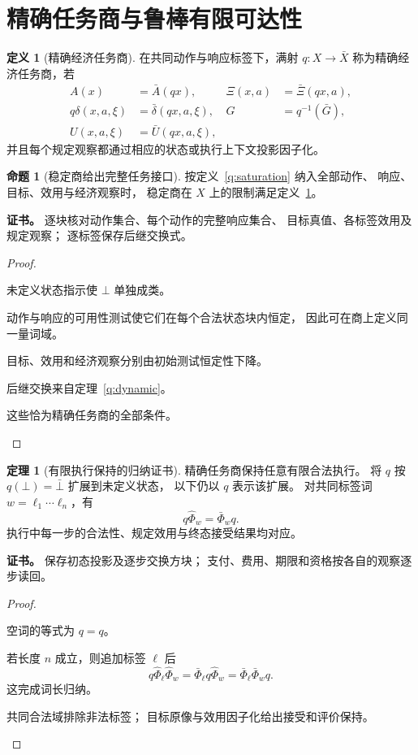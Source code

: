 \documentclass[UTF8,12pt,a4paper,openany,fontset=none,zihao=false]{ctexrep}
\theoremstyle{definition}
\newtheorem{definition}{定义}[chapter]
\newtheorem{theorem}{定理}[chapter]
\newtheorem{proposition}{命题}[chapter]
\newenvironment{certificate}{\par\noindent\textbf{证书。}\ignorespaces}{\par}
\newcommand{\1}{\mathbf 1}
\begin{document}
\section{精确任务商与鲁棒有限可达性}
\begin{definition}[精确经济任务商]
\label{q:exact}
在共同动作与响应标签下，满射 \(q:X\to\bar X\)
称为精确经济任务商，若
\[
\begin{aligned}
A(x)&=\bar A(qx),&
\Xi(x,a)&=\bar\Xi(qx,a),\\
q\delta(x,a,\xi)&=\bar\delta(qx,a,\xi),&
G&=q^{-1}(\bar G),\\
U(x,a,\xi)&=\bar U(qx,a,\xi),
\end{aligned}
\]
并且每个规定观察都通过相应的状态或执行上下文投影因子化。
\end{definition}
\begin{proposition}[稳定商给出完整任务接口]
\label{q:stable-exact}
按定义~\ref{q:saturation} 纳入全部动作、
响应、目标、效用与经济观察时，
稳定商在 \(X\) 上的限制满足定义~\ref{q:exact}。
\end{proposition}
\begin{certificate}
逐块核对动作集合、每个动作的完整响应集合、
目标真值、各标签效用及规定观察；
逐标签保存后继交换式。
\end{certificate}
\begin{proof}
\begin{semanticsteps}
\item 未定义状态指示使 \(\bot\) 单独成类。
\item 动作与响应的可用性测试使它们在每个合法状态块内恒定，
因此可在商上定义同一量词域。
\item 目标、效用和经济观察分别由初始测试恒定性下降。
\item 后继交换来自定理~\ref{q:dynamic}。
\item 这些恰为精确任务商的全部条件。
\end{semanticsteps}
\end{proof}
\begin{theorem}[有限执行保持的归纳证书]
\label{q:execution}
精确任务商保持任意有限合法执行。
将 \(q\) 按 \(q(\bot)=\bar\bot\) 扩展到未定义状态，
以下仍以 \(q\) 表示该扩展。
对共同标签词 \(w=\ell_1\cdots\ell_n\)，有
\[
q\widehat\Phi_w=\bar\Phi_wq.
\]
执行中每一步的合法性、规定效用与终态接受结果均对应。
\end{theorem}
\begin{certificate}
保存初态投影及逐步交换方块；
支付、费用、期限和资格按各自的观察逐步读回。
\end{certificate}
\begin{proof}
\begin{semanticsteps}
\item 空词的等式为 \(q=q\)。
\item 若长度 \(n\) 成立，则追加标签 \(\ell\) 后
\[
q\widehat\Phi_\ell\widehat\Phi_w
=\bar\Phi_\ell q\widehat\Phi_w
=\bar\Phi_\ell\bar\Phi_wq.
\]
这完成词长归纳。
\item 共同合法域排除非法标签；
目标原像与效用因子化给出接受和评价保持。
\end{semanticsteps}
\end{proof}
\end{document}

